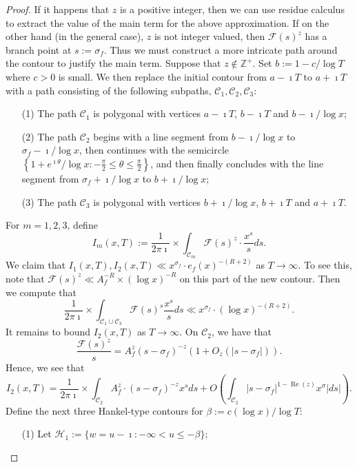 \documentclass[11pt,reqno,a4letter]{article}
\numberwithin{figure}{section}
\numberwithin{table}{section}
\theoremstyle{plain}
\numberwithin{theorem}{section}
\theoremstyle{definition}
\renewcommand{\Re}{\operatorname{Re}}
\begin{document}
\begin{proof}
If it happens that $z$ is a positive integer, then we can use residue calculus to extract the 
value of the main term for the above approximation. If on the other hand (in the general case), 
$z$ is not integer valued, then $\mathcal{F}(s)^{z}$ has a branch point at $s := \sigma_f$. 
Thus we must construct a more intricate path around the contour to justify the main term. 
Suppose that $z \notin \mathbb{Z}^{+}$. Set $b := 1 - c / \log T$ where $c > 0$ is small. 
We then replace the initial contour from $a-\imath T$ to $a+\imath T$ with a path 
consisting of the following subpaths, $\mathcal{C}_1,\mathcal{C}_2,\mathcal{C}_3$: 
\begin{itemize}
\item[(1)] The path $\mathcal{C}_1$ is polygonal with vertices $a-\imath T$, 
     $b-\imath T$ and $b - \imath / \log x$; 
\item[(2)] The path $\mathcal{C}_2$ begins with a line segment from $b-\imath / \log x$ to 
     $\sigma_f - \imath/\log x$, then continues with the semicircle 
     $\left\{1+e^{\imath\theta}/\log x: -\frac{\pi}{2} \leq \theta \leq \frac{\pi}{2}\right\}$, 
     and then finally concludes with the line segment from 
     $\sigma_f + \imath/\log x$ to $b+\imath/\log x$; 
\item[(3)] The path $\mathcal{C}_3$ is polygonal with vertices $b+\imath/\log x$, 
     $b + \imath T$ and $a + \imath T$. 
\end{itemize}
For $m = 1,2,3$, define 
\[
I_m(x, T) := \frac{1}{2\pi\imath} \times \int_{\mathcal{C}_m} \mathcal{F}(s)^{z} \cdot 
     \frac{x^s}{s} ds. 
\]
We claim that $I_1(x, T),I_2(x,T) \ll x^{\sigma_f} \cdot e_f(x)^{-(R+2)}$ as $T \rightarrow \infty$. 
To see this, note that $\mathcal{F}(s)^{z} \ll A_f^{-R} \times (\log x)^{-R}$ on this part of 
the new contour. Then we compute that 
\[
\frac{1}{2\pi\imath} \times \int_{\mathcal{C}_1 \cup \mathcal{C}_3} 
     \mathcal{F}(s)^s \frac{x^s}{s} ds \ll x^{\sigma_f} \cdot (\log x)^{-(R+2)}. 
\]
It remains to bound $I_2(x, T)$ as $T \rightarrow \infty$. On $\mathcal{C}_2$, we have 
that 
\[
\frac{\mathcal{F}(s)^{z}}{s} = A_f^{z} (s-\sigma_f)^{-z}\left(1 + O_z\left(|s-\sigma_f|\right)\right). 
\]
Hence, we see that 
\[
I_2(x, T) = \frac{1}{2\pi\imath} \times \int_{\mathcal{C}_2} A_f^{z} \cdot (s-\sigma_f)^{-z} x^s ds + 
     O\left(\int_{\mathcal{C}_2} |s-\sigma_f|^{1-\Re(z)} x^{\sigma} |ds|\right). 
\]
Define the next three Hankel-type contours for $\beta := c (\log x) / \log T$: 
\begin{itemize}
\item[(1)] Let $\mathcal{H}_1 := \{w=u-\imath: -\infty < u \leq -\beta\}$; 

\end{itemize}
\end{proof}
\end{document}
